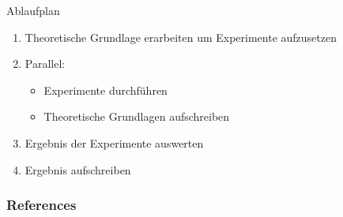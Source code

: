 \documentclass[10pt]{beamer}
\begin{document}
\begin{frame}{Ablaufplan}
 \begin{enumerate}
  \item Theoretische Grundlage erarbeiten um Experimente aufzusetzen
  \item Parallel: \begin{itemize}
         \item Experimente durchführen
         \item Theoretische Grundlagen aufschreiben
        \end{itemize}
  \item Ergebnis der Experimente auswerten
  \item Ergebnis aufschreiben
 \end{enumerate}

\end{frame}


\begin{frame}[allowframebreaks]
\nocite{*}
\frametitle{References}
\printbibliography
\end{frame}
\end{document}
